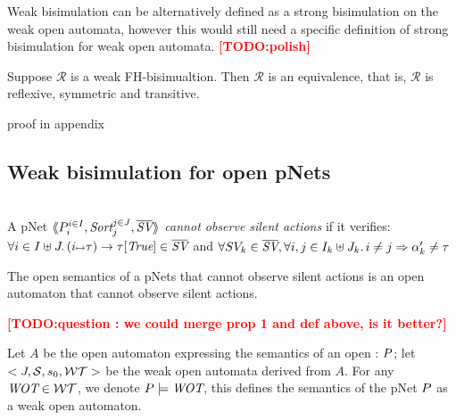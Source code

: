 \documentclass{lncs/llncs}
\newcommand{\TODO}[1]{\textcolor{red}{\textbf{[TODO:#1]}}}
\begin{document}
Weak bisimulation can be alternatively defined as a strong bisimulation on the weak open automata, however this would still need a specific definition of strong bisimulation for weak open automata. \TODO{polish}



\begin{theorem}\label{thm-weak-equiv} Suppose $\mathcal{R}$ 
is a weak FH-bisimualtion. Then $\mathcal{R}$ is an equivalence, that is, $\mathcal{R}$ is 
reflexive, symmetric and transitive.
\end{theorem}
proof in appendix



\subsection{Weak bisimulation for open pNets}
\begin{definition}~\\
A pNet $\mylangle \pNet_i^{i\in I} , \Sort_j^{j\in J}, \set{\symb{SV}}\myrangle$
 \emph{cannot observe silent actions} if it verifies:\\ $\forall i\in I\uplus J.\, \SV{(i\mapsto \tau)}{\tau}{\True}\in \set{\symb{SV}}$ and $\forall SV_k\in \set{\symb{SV}}, \forall i,j\in I_k\uplus J_k.\,i\neq j \Rightarrow \alpha'_k\neq\tau$
\end{definition}

\begin{property}
The open semantics of a pNets that cannot observe silent actions is an open automaton that  cannot observe silent actions.
\end{property}

\TODO{question : we could merge prop 1 and def above, is it better?}

\begin{definition}
Let $A$ be the open automaton expressing the semantics of an open \pNet: $P$; let $<J,\mathcal{S},s_0,  \mathcal{WT}>$ be the weak open automata derived from $A$. For any $\WOT\in\WT$, we denote $\pNet \models \WOT$, this defines the semantics of the pNet $P$ as a weak open automaton.
\end{definition}

\end{document}
